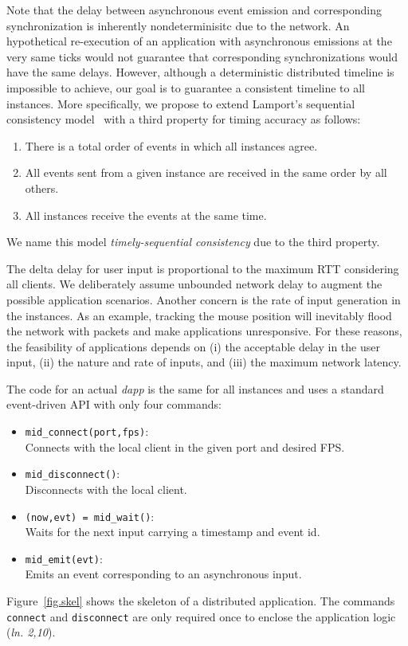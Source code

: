\documentclass[sigplan,screen]{acmart}
\newcommand{\lin}[1]{(\emph{ln. #1}\xspace)}
\newcommand{\dapp}{\emph{dapp}\xspace}
\begin{document}
Note that the delay between asynchronous event emission and corresponding
synchronization is inherently nondeterminisitc due to the network.
An hypothetical re-execution of an application with asynchronous emissions at
the very same ticks would not guarantee that corresponding synchronizations
would have the same delays.
%
However, although a deterministic distributed timeline is impossible to
achieve, our goal is to guarantee a consistent timeline to all instances.
%
More specifically, we propose to extend Lamport's sequential consistency
model~\cite{lamport} with a third property for timing accuracy as follows:
%
\begin{enumerate}
    \item There is a total order of events in which all instances agree.
    \item All events sent from a given instance are received in the same order by all others.
    \item All instances receive the events at the same time.
\end{enumerate}
%
We name this model \emph{timely-sequential consistency} due to the third
property.

The delta delay for user input is proportional to the maximum RTT considering
all clients.
We deliberately assume unbounded network delay to augment the possible
application scenarios.
Another concern is the rate of input generation in the instances.
As an example, tracking the mouse position will inevitably flood the network
with packets and make applications unresponsive.
For these reasons, the feasibility of applications depends on
    (i) the acceptable delay in the user input,
    (ii) the nature and rate of inputs, and
    (iii) the maximum network latency.

The code for an actual \dapp is the same for all instances and uses a standard
event-driven API with only four commands:
%
\begin{itemize}
\item \texttt{mid\_connect(port,fps)}:   \\Connects with the local client in the given port and desired FPS.
\item \texttt{mid\_disconnect()}:        \\Disconnects with the local client.
\item \texttt{(now,evt) = mid\_wait()}:  \\Waits for the next input carrying a timestamp and event id.
\item \texttt{mid\_emit(evt)}:           \\Emits an event corresponding to an asynchronous input.
\end{itemize}
%
Figure~\ref{fig.skel} shows the skeleton of a distributed application.
The commands \texttt{connect} and \texttt{disconnect} are only required once to
enclose the application logic \lin{2,10}.
\end{document}
